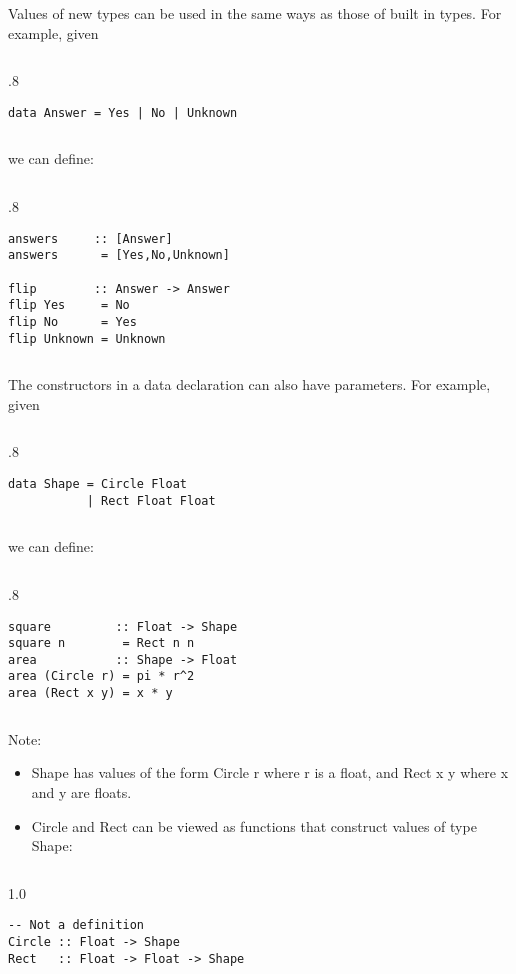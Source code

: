\documentclass{beamer}
\newenvironment{codeblock}[1][.8]{%
\begin{columns}
\begin{column}{#1\linewidth}
\begin{exampleblock}{}}{%
\end{exampleblock}
\end{column}
\end{columns}}
\newenvironment{execblock}[1][.8]{%
\begin{columns}
\begin{column}{#1\linewidth}
\begin{block}{}}{%
\end{block}
\end{column}
\end{columns}}
\def\slideskip{\vskip 0.1in}
\begin{document}
\begin{frame}[fragile]
\large

Values of new types can be used in the same ways 
as those of built in types.  For example, given
\slideskip

\begin{codeblock}
\begin{verbatim}
data Answer = Yes | No | Unknown 
\end{verbatim}
\end{codeblock}

\slideskip
we can define:
\slideskip

\begin{codeblock}
\begin{verbatim}
answers     :: [Answer] 
answers      = [Yes,No,Unknown] 

flip        :: Answer -> Answer 
flip Yes     = No 
flip No      = Yes 
flip Unknown = Unknown 
\end{verbatim}
\end{codeblock}

\end{frame}

\begin{frame}[fragile]
\large

The constructors in a data declaration can also have 
parameters.  For example, given 
\slideskip

\begin{codeblock}
\begin{verbatim}
data Shape = Circle Float 
           | Rect Float Float 
\end{verbatim}
\end{codeblock}

\slideskip
we can define:
\slideskip

\begin{codeblock}
\begin{verbatim}
square         :: Float -> Shape 
square n        = Rect n n 
area           :: Shape -> Float 
area (Circle r) = pi * r^2 
area (Rect x y) = x * y 
\end{verbatim}
\end{codeblock}

\end{frame}

\begin{frame}[fragile]
\LARGE

Note: 
\begin{itemize}
\item Shape has values of the form Circle r where r is 
a float, and Rect x y where x and y are floats. 
\item Circle and Rect can be viewed as functions that 
construct values of type Shape: 
\end{itemize}


\begin{execblock}[1.0]
\begin{verbatim}
-- Not a definition
Circle :: Float -> Shape 
Rect   :: Float -> Float -> Shape
\end{verbatim}
\end{execblock}


\end{frame}
\end{document}
